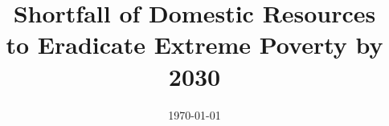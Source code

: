 % 
% 

% 


\title{Shortfall of Domestic Resources\\ to Eradicate Extreme Poverty by 2030} 


\date{\today} %



\sloppy
\maketitle




